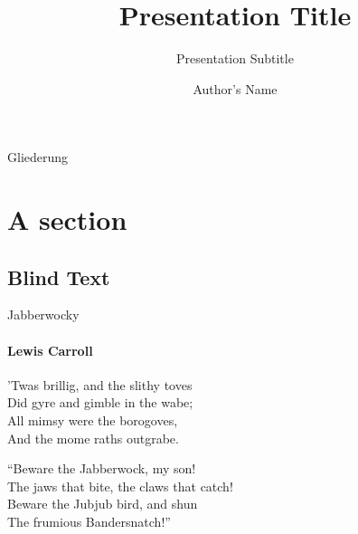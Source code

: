 \documentclass[compress]{beamer}
\title{Presentation Title} %
\subtitle{Presentation Subtitle} %
\author{Author's Name}
\begin{document}
\frame[plain]{\maketitle}
\begin{frame}[plain]{Gliederung}
\tableofcontents[subsectionstyle=hide]
\end{frame}
	

\section{A section}
\subsection{Blind Text}
\begin{frame}{Jabberwocky}
\framesubtitle{Lewis Carroll}%
%
'Twas brillig, and the slithy toves\\
Did gyre and gimble in the wabe;\\
All mimsy were the borogoves,\\
And the mome raths outgrabe.\\\bigskip

“Beware the Jabberwock, my son!\\
The jaws that bite, the claws that catch!\\
Beware the Jubjub bird, and shun\\
The frumious Bandersnatch!”\\
\end{frame}
\end{document}

